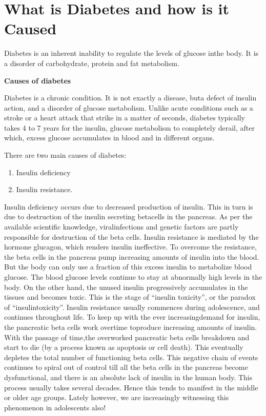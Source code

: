 \chapter{What is Diabetes and how is it Caused}\label{chap3}

Diabetes is an inherent inability to regulate the levels of glucose in\break the body. It is a disorder of carbohydrate, protein and fat metabolism.

\noindent
\textbf{Causes of diabetes}

Diabetes is a chronic condition. It is not exactly a disease, but\break a defect of insulin action, and a disorder of glucose metabolism. Unlike acute conditions such as a stroke or a heart attack that strike in a matter of seconds, diabetes typically takes 4 to 7 years for the insulin, glucose metabolism to completely derail, after which, excess glucose accumulates in blood and in different organs.

There are two main causes of diabetes:

\vspace{-\topsep}
\begin{enumerate}
\itemsep=0pt
\item Insulin deficiency
 \item Insulin resistance.
\end{enumerate}
\vspace{-\topsep}

Insulin deficiency occurs due to decreased production of insulin. This in turn is due to destruction of the insulin secreting beta\break cells in the pancreas. As per the available scientific knowledge, viral\break infe\-ctions and genetic factors are partly responsible for destruction of the beta cells. Insulin resistance is mediated by the hormone glucagon, which renders insulin ineffective. To overcome the resistance, the beta cells in the pancreas pump increasing amounts of insulin into the blood. But the body can only use a fraction of this excess insulin to meta\-bolize blood glucose. The blood glucose levels continue to stay at abnormally high levels in the body. On the other hand, the unused insu\-lin progressively accumulates in the tissues and becomes toxic. This is the stage of “insulin toxicity”, or the paradox of “insulin\break toxicity”. Insulin resi\-stance usually commences during adolescence, and continues throughout life. To keep up with the ever increasing\break demand for insulin, the pancreatic beta cells work overtime to\break produce increasing amounts of insulin. With the passage of time,\break the overworked pancreatic beta cells breakdown and start to die (by a process known as apoptosis or cell death). This eventually depletes the total number of functioning beta cells. This negative chain of events conti\-nues to spiral out of control till all the beta cells in the pancreas become dysfunc\-tional, and there is an absolute lack of insulin in the human body. This process usually takes several decades. Hence this tends to manifest in the middle or older age groups. Lately however, we are increasingly witnessing this phenomenon in adolescents also!

